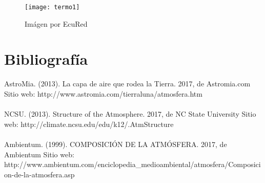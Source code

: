 \documentclass{article}
\begin{document}
\begin{figure}[ht!]
\centering
\texttt{[image: termo1]}
\caption{Imágen por EcuRed \label{overflow}}
\end{figure}

\section{Bibliografía}
AstroMia. (2013). La capa de aire que rodea la Tierra. 2017, de Astromia.com Sitio web: http://www.astromia.com/tierraluna/atmosfera.htm \\
\\
NCSU. (2013). Structure of the Atmosphere. 2017, de NC State University Sitio web: http://climate.ncsu.edu/edu/k12/.AtmStructure \\
\\
Ambientum. (1999). COMPOSICIÓN DE LA ATMÓSFERA. 2017, de Ambientum Sitio web: http://www.ambientum.com/enciclopedia_medioambiental/atmosfera/Composicion-de-la-atmosfera.asp \\
\\
\end{document}
